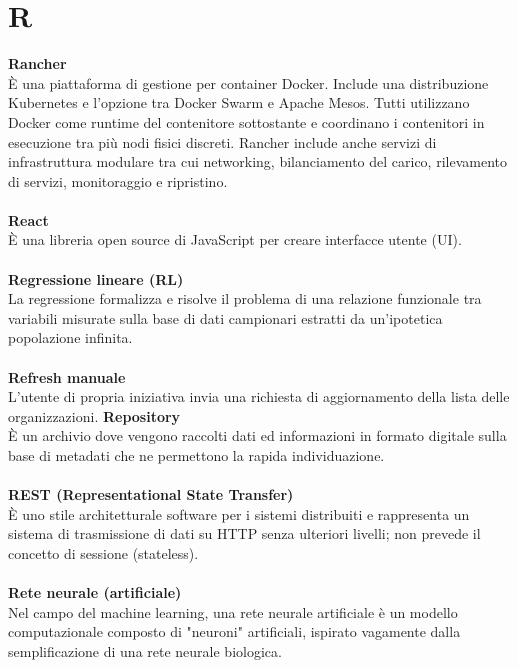 \section{R}
\textbf{Rancher}\\
È una piattaforma di gestione per container Docker. Include una distribuzione Kubernetes e l'opzione tra Docker Swarm e Apache Mesos. Tutti utilizzano Docker come runtime del contenitore sottostante e coordinano i contenitori in esecuzione tra più nodi fisici discreti. Rancher include anche servizi di infrastruttura modulare tra cui networking, bilanciamento del carico, rilevamento di servizi, monitoraggio e ripristino. \\ \\
\textbf{React}\\
È una libreria open source di JavaScript per creare interfacce utente (UI). \\ \\
\textbf{Regressione lineare (RL)}\\
La regressione formalizza e risolve il problema di una relazione funzionale tra variabili misurate sulla base di dati campionari estratti da un'ipotetica popolazione infinita. \\ \\
\textbf{Refresh manuale}\\
L'utente di propria iniziativa invia una richiesta di aggiornamento della lista delle organizzazioni.
\textbf{Repository}\\
È un archivio dove vengono raccolti dati ed informazioni in formato digitale sulla base di metadati che ne permettono la rapida individuazione. \\ \\
\textbf{REST (Representational State Transfer)}\\
È uno stile architetturale software per i sistemi distribuiti e rappresenta un sistema di trasmissione di dati su HTTP senza ulteriori livelli; non prevede il concetto di sessione (stateless). \\ \\
\textbf{Rete neurale (artificiale)}\\
Nel campo del machine learning, una rete neurale artificiale è un modello computazionale composto di "neuroni" artificiali, ispirato vagamente dalla semplificazione di una rete neurale biologica. \\ \\
\clearpage